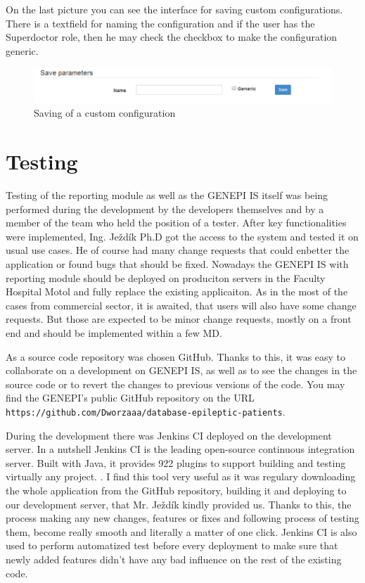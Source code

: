 \documentclass[thesis=B,english]{FITthesis}[2012/10/20]
\begin{document}
On the last picture you can see the interface for saving custom configurations. There is a textfield for naming the configuration and if the user has the Superdoctor role, then he may check the checkbox to make the configuration generic.


\begin{figure}[ht]\centering
\includegraphics[width=0.5\paperwidth]{save}
		\caption{Saving of a custom configuration}
\end{figure}

\chapter{Testing}

Testing of the reporting module as well as the GENEPI IS itself was being performed during the development by the developers themselves and by a member of the team who held the position of a tester. After key  functionalities were implemented, Ing. Ježdík Ph.D got the access to the system and tested it on usual use cases. He of course had many change requests that could enbetter the application or found bugs that should be fixed. Nowadays the GENEPI IS with reporting module should be deployed on produciton servers in the Faculty Hospital Motol and fully replace the existing applicaiton. As in the most of the cases from commercial sector, it is awaited, that users will also have some change requests. But those are expected to be minor change requests, mostly on a front end and should be implemented within a few MD.

As a source code repository was chosen GitHub. Thanks to this, it was easy to collaborate on a development on GENEPI IS, as well as to see the changes in the source code or to revert the changes to previous versions of the code. You may find the GENEPI's public GitHub repository on the URL \verb| https://github.com/Dworzaaa/database-epileptic-patients|.

During the development there was Jenkins CI deployed on the development server. In a nutshell Jenkins CI is the leading open-source continuous integration server. Built with Java, it provides 922 plugins to support building and testing virtually any project. \cite{jenkins}. I find this tool very useful as it was regulary downloading the whole application from the GitHub repository, building it and deploying to our development server, that Mr. Ježdík kindly provided us. Thanks to this, the process making any new changes, features or fixes and following process of testing them, become really smooth and literally a matter of one click. Jenkins CI is also used to perform automatized test before every deployment to make sure that newly added features didn't have any bad influence on the rest of the existing code.
\end{document}
